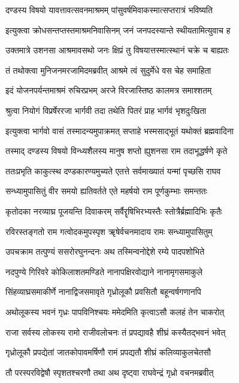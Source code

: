 \twolineshloka
{दण्डस्य विषयो यावत्तावत्सवनमाश्रमम्}
{पांसुवर्षमिवाकस्मात्सप्तरात्रं भविष्यति}%

\twolineshloka
{इत्युक्त्वा क्रोधसन्तप्तस्तमाश्रमनिवासिनम्}
{जनं जनपदस्यान्ते स्थीयतामित्युवाच ह}%

\twolineshloka
{उक्तमात्रे उशनसा आश्रमावसथो जनः}
{क्षिप्रं तु विषयात्तस्मात्स्थानं चक्रे च बाह्यतः}%

\twolineshloka
{तं तथोक्त्वा मुनिजनमरजामिदमब्रवीत्}
{आश्रमे त्वं सुदुर्मेधे वस चेह समाहिता}%

\twolineshloka
{इदं योजनपर्यन्तमाश्रमं रुचिरप्रभम्}
{अरजे विरजास्तिष्ठ कालमत्र समाश्शतम्}%

\twolineshloka
{श्रुत्वा नियोगं विप्रर्षेररजा भार्गवी तदा}
{तथेति पितरं प्राह भार्गवं भृशदुःखिता}%

\twolineshloka
{इत्युक्त्वा भार्गवो वासं तस्मादन्यमुपाक्रमत्}
{सप्ताहे भस्मसाद्भूतं यथोक्तं ब्रह्मवादिना}%

\twolineshloka
{तस्माद् दण्डस्य विषयो विन्ध्यशैलस्य मानुष}
{शप्तो ह्युशनसा राम तदाभूद्धर्षणे कृते}%

\twolineshloka
{ततःप्रभृति काकुत्स्थ दण्डकारण्यमुच्यते}
{एतत्ते सर्वमाख्यातं यन्मां पृच्छसि राघव}%

\twolineshloka
{सन्ध्यामुपासितुं वीर समयो ह्यतिवर्तते}
{एते महर्षयो राम पूर्णकुम्भाः समन्ततः}%

\twolineshloka
{कृतोदका नरव्याघ्र पूजयन्ति दिवाकरम्}
{सर्वैरॄषिभिरभ्यस्तैः स्तोत्रैर्ब्रह्मादिभिः कृतैः}%

\twolineshloka
{रविरस्तङ्गतो राम गत्वोदकमुपस्पृश}
{ॠषेर्वचनमादाय रामः सन्ध्यामुपासितुम्}%

\twolineshloka
{उपचक्राम तत्पुण्यं ससरोरघुनन्दनः}
{अथ तस्मिन्वनोद्देशे रम्ये पादपशोभिते}%

\twolineshloka
{नदपुण्ये गिरिवरे कोकिलाशतमण्डिते}
{नानापक्षिरवोद्याने नानामृगसमाकुले}%

\twolineshloka
{सिंहव्याघ्रसमाकीर्णे नानाद्विजसमावृते}
{गृध्रोलूकौ प्रवसितौ बहून्वर्षगणानपि}%

\twolineshloka
{अथोलूकस्य भवनं गृध्रः पापविनिश्चयः}
{ममेदमिति कृत्वाऽसौ कलहं तेन चाकरोत्}%

\twolineshloka
{राजा सर्वस्य लोकस्य रामो राजीवलोचनः}
{तं प्रपद्यावहै शीघ्रं कस्यैतद्भवनं भवेत्}%

\twolineshloka
{गृध्रोलूकौ प्रपद्येतां जातकोपावमर्षिणौ}
{रामं प्रपद्यतौ शीघ्रं कलिव्याकुलचेतसौ}%

\twolineshloka
{तौ परस्परविद्वेषौ स्पृशतश्चरणौ तथा}
{अथ दृष्ट्वा राघवेन्द्रं गृध्रो वचनमब्रवीत्}%

